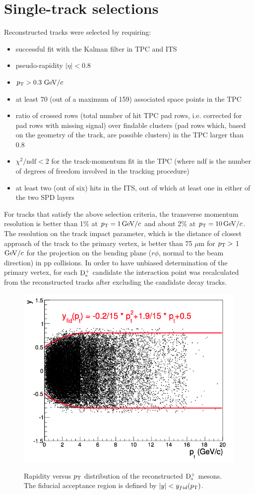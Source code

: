 \section{Single-track selections}
\label{sec:singleTrCuts}
Reconstructed tracks were selected by requiring:
\begin{itemize}
\item successful fit with the Kalman filter in TPC and ITS
\item pseudo-rapidity $|\eta| < 0.8$
\item $p_{\rm T} > 0.3~\mathrm{GeV}/c$
\item at least 70 (out of a maximum of 159)
associated space points in the TPC
\item ratio of crossed rows (total number of hit TPC pad rows, i.e. corrected 
for pad rows with missing signal) over findable clusters (pad rows which, 
based on the geometry of the track, are possible clusters) in the TPC larger than 0.8
\item $\chi^2/\mathrm{ndf} < 2$ for the track-momentum fit in the TPC (where ndf is the number of degrees of 
freedom involved in the tracking procedure)
\item at least two (out of six) hits in the ITS, out of which at least one 
in either of the two SPD layers
\end{itemize}
For tracks that satisfy the above selection criteria, the transverse momentum 
resolution is better than 1$\%$ at $p_{\rm T} = 1\, \mathrm{GeV}/c$ and about 2\% at $p_{\rm T} = 10 \, \mathrm{GeV}/c$. 
The resolution on the track impact parameter, which is the distance of closest 
approach of the track to the primary vertex, is better than 75 $\mu$m for 
$p_{\rm T} >$ 1 $\mathrm{GeV}/c$ for the projection on the bending plane ($r\phi$, normal to 
the beam direction) in pp collisions.
In order to have unbiased determination of the primary vertex, for each 
${\rm D_s^+}$ candidate the interaction point was recalculated from the reconstructed 
tracks after excluding the candidate decay tracks.
\begin{figure}[!htbp]
\begin{center}
\includegraphics[width=.5\textwidth]{FigCap4/YvsPt.png}
\label{fig:singtrafter}
\caption{Rapidity versus $p_{\rm T}$ distribution of the reconstructed ${\rm D_s^+}$ mesons. The fiducial acceptance region is defined by $|y| < y_{fid}(p_{\rm T})$.}
\end{center}
\end{figure}

